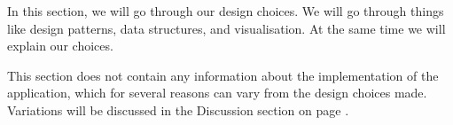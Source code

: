 In this section, we will go through our design choices. We will go through things like design patterns, data structures, and visualisation. At the same time we will explain our choices.

This section does not contain any information about the implementation of the application, which for several reasons can vary from the design choices made. Variations will be discussed in the Discussion section on page \pageref{sec:Discussion}.